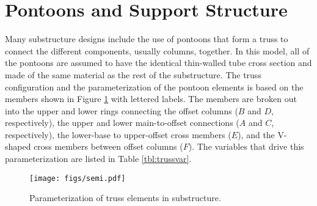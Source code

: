 \section{Pontoons and Support Structure}
Many substructure designs include the use of pontoons that form a truss
to connect the different components, usually columns, together.  In this
model, all of the pontoons are assumed to have the identical thin-walled
tube cross section and made of the same material as the rest of the
substructure.  The truss configuration and the parameterization of the
pontoon elements is based on the members shown in Figure
\ref{fig:pontoon} with lettered labels.  The members are broken out into
the upper and lower rings connecting the offset columns ($B$ and $D$,
respectively), the upper and lower main-to-offset connections ($A$ and
$C$, respectively), the lower-base to upper-offset cross members ($E$),
and the V-shaped cross members between offset columns ($F$). The
variables that drive this parameterization are listed in Table
\ref{tbl:trussvar}.
%
\begin{figure}[htb]
  \begin{center}
    \texttt{[image: figs/semi.pdf]}
    \caption{Parameterization of truss elements in substructure.}
    \label{fig:pontoon}
  \end{center}
\end{figure}
%

